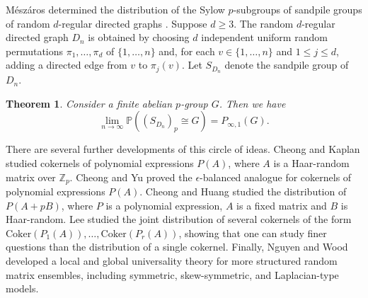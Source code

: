 \documentclass[12pt]{amsart}
\newtheorem{theorem}{Theorem}[section]
\theoremstyle{definition}
\newcommand{\PPP}{\mathbb{P}}
\newcommand{\Zp}{\Z_p}
\newcommand{\Z}{\mathbb{Z}}
\newcommand{\Coker}{\text{Coker}}
\begin{document}

M\'esz\'aros determined the distribution of the Sylow $p$-subgroups of sandpile groups of random $d$-regular directed graphs \cite{meszaros2020distribution}.
Suppose $d\ge 3$.  The random $d$-regular directed graph $D_n$ is obtained by choosing $d$ independent uniform random permutations $\pi_1,\dots,\pi_d$ of $\{1,\dots,n\}$ and, for each $v\in\{1,\dots,n\}$ and $1\le j\le d$, adding a directed edge from $v$ to $\pi_j(v)$.  Let $S_{D_n}$ denote the sandpile group of $D_n$.

\begin{theorem}\cite[Theorem~1.1]{meszaros2020distribution}\label{mes_thm_directed}
Consider a finite abelian $p$-group $G$. Then we have
\[
\lim_{n\to\infty}
\PPP\left( (S_{D_n})_{p} \cong G \right)
=
P_{\infty,1}(G).
\]
\end{theorem}




There are several further developments of this circle of ideas. Cheong and Kaplan \cite{cheong2022generalizations} studied cokernels of polynomial expressions $P(A)$, where $A$ is a Haar-random matrix over $\Zp$.
Cheong and Yu \cite{cheong2023distribution} proved the $\epsilon$-balanced analogue for cokernels of polynomial expressions $P(A)$.
Cheong and Huang \cite{cheong2025cokernel} studied the distribution of $P(A+pB)$, where $P$ is a polynomial expression, $A$ is a fixed matrix and $B$ is Haar-random.
Lee \cite{lee2023joint} studied the joint distribution of several cokernels of the form $\Coker(P_1(A)),\dots,\Coker(P_r(A))$, showing that one can study finer questions than the distribution of a single cokernel. 
Finally, Nguyen and Wood \cite{nguyen2025local} developed a local and global universality theory for more structured random matrix ensembles, including symmetric, skew-symmetric, and Laplacian-type models.
\end{document}

